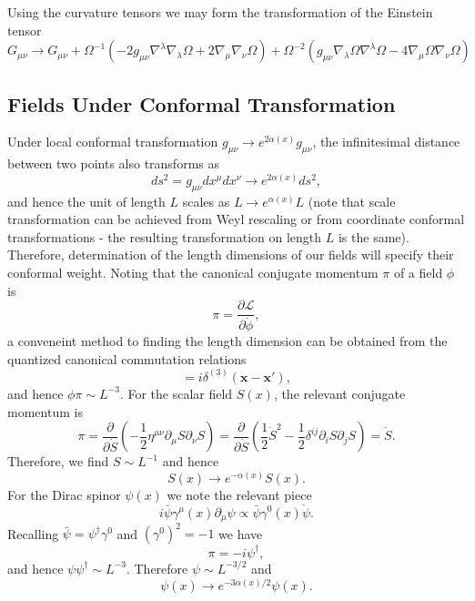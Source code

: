 \documentclass[10pt,letterpaper]{article}
\numberwithin{equation}{subsection}
\begin{document}
Using the curvature tensors we may form the transformation of the Einstein tensor
\begin{equation}
G_{\mu\nu} \to G_{\mu\nu} + \Omega^{-1}\left( -2g_{\mu\nu}\nabla^\lambda \nabla_\lambda \Omega + 2\nabla_\mu \nabla_\nu \Omega\right) +
\Omega^{-2}\left( g_{\mu\nu} \nabla_\lambda \Omega \nabla^\lambda \Omega - 4 \nabla_\mu \Omega \nabla_\nu \Omega\right)\label{GRA14}
\end{equation}
\subsection{Fields Under Conformal Transformation}\label{A2}
Under local conformal transformation $g_{\mu\nu} \to e^{2\alpha(x)}g_{\mu\nu}$, the infinitesimal distance between two points also transforms as
\begin{equation}
	ds^2 = g_{\mu\nu}dx^\mu dx^\nu \to e^{2\alpha(x)} ds^2,
\end{equation}
and hence the unit of length $L$ scales as $L \to e^{\alpha(x)}L$ (note that scale transformation can be achieved from Weyl rescaling or from coordinate conformal transformations - the resulting transformation on length $L$ is the same). Therefore, determination of the length dimensions of our fields will specify their conformal weight. Noting that the canonical conjugate momentum $\pi$ of a field $\phi$ is 
\begin{equation}
\pi = \frac{\partial \mathcal L}{\partial \dot \phi},
\end{equation}
a conveneint method to finding the length dimension can be obtained from the quantized canonical commutation relations
\begin{equation}
	[\phi(\mathbf x),\pi(\mathbf x')] = i \delta^{(3)}(\mathbf x - \mathbf x'),
\end{equation}
and hence $\phi \pi \sim L^{-3}$. For the scalar field $S(x)$, the relevant conjugate momentum is 
\begin{equation}
	\pi = \frac{\partial}{\partial \dot S} \left(-\frac12 \eta^{\mu\nu} \partial_\mu S \partial_\nu S \right) = 
\frac{\partial}{\partial \dot S}\left(\frac12\dot S^2- \frac12 \delta^{ij} \partial_i S \partial_j S\right) = \dot S.
\end{equation}
Therefore, we find $S\sim L^{-1}$ and hence
\begin{equation}
	S(x)\to e^{-\alpha(x)} S(x).
\end{equation} 
For the Dirac spinor $\psi(x)$ we note the relevant piece
\begin{equation}
	i\bar \psi\gamma^\mu(x) \partial_\mu \psi \propto \bar \psi \gamma^0(x) \dot \psi.
\end{equation}
Recalling $\bar\psi = \psi^\dagger \gamma^0$ and $(\gamma^0)^2=-1$ we have
\begin{equation}
	\pi = -i \psi^\dagger,
\end{equation}
and hence $\psi \psi^\dagger \sim L^{-3}$. Therefore $\psi \sim L^{-3/2}$ and 
\begin{equation}
\psi(x) \to e^{-3 \alpha(x)/2} \psi(x).
\end{equation}
\end{document}

